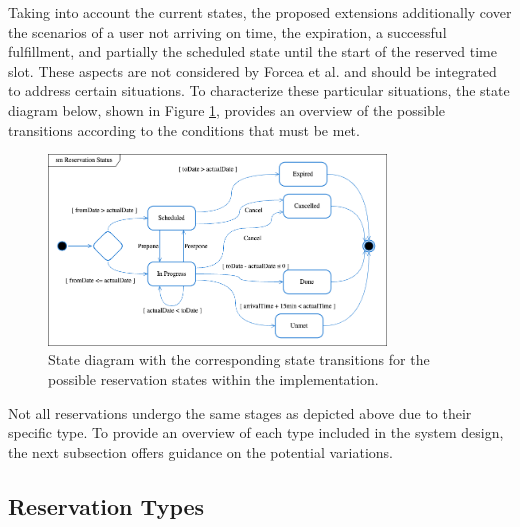 \noindent Taking into account the current states, the proposed extensions additionally cover the scenarios of a user not arriving on time, the expiration, a successful fulfillment, and partially the scheduled state until the start of the reserved time slot. 
These aspects are not considered by Forcea et al. and should be integrated to address certain situations.
To characterize these particular situations, the state diagram below, shown in Figure \ref{fig:reservation-states}, provides an overview of the possible transitions according to the conditions that must be met.

\begin{figure}[h]
    \centering
    \includegraphics[width=0.8\textwidth,keepaspectratio]{resources/images/main/5_design/ReservationStatusStates.png}
    \caption{State diagram with the corresponding state transitions for the possible reservation states within the implementation.}
    \label{fig:reservation-states}
\end{figure}

\noindent Not all reservations undergo the same stages as depicted above due to their specific type. To provide an overview of each type included in the system design, the next subsection offers guidance on the potential variations.

\newpage

\subsection{Reservation Types}
\label{ch:Design:sec:Reservation:ssec:Reservation Types}

